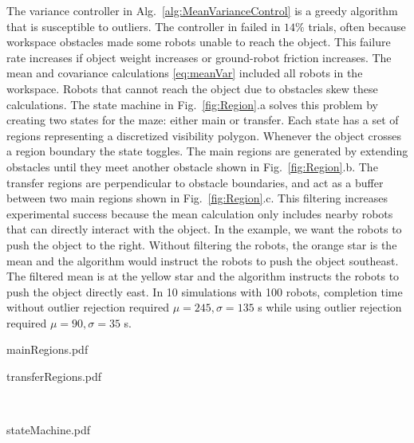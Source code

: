 The variance controller in Alg.~\ref{alg:MeanVarianceControl} is a greedy algorithm that is susceptible to outliers. The controller in \cite{Shahrokhi2015} failed in $14\%$ trials, often because workspace obstacles made some robots unable to reach the object. This failure rate increases if  object weight increases or ground-robot friction increases. The mean and covariance calculations \eqref{eq:meanVar} included all robots in the workspace. Robots that cannot reach the object due to obstacles skew these calculations. The state machine in Fig.\ \ref{fig:Region}.a solves this problem by creating two states for the maze: either main or transfer. Each state has a set of regions representing a discretized visibility polygon. Whenever the object crosses a region boundary the state toggles. The main regions are generated by extending obstacles until they meet another obstacle shown in Fig.~\ref{fig:Region}.b. The transfer regions are perpendicular to obstacle boundaries, and act as a buffer between two main regions shown in Fig.~\ref{fig:Region}.c.
This filtering increases experimental success because the mean calculation only includes nearby robots that can directly interact with the object. In the example, we want the robots to push the object to the right. Without filtering the robots, the orange star is the mean and the algorithm would instruct the robots to push the object southeast. The filtered mean is at the yellow star and the algorithm instructs the robots to push the object directly east. 
In 10 simulations with 100 robots, completion time without outlier rejection required $\mu=245, \sigma=135$ s while using outlier rejection required $\mu=90, \sigma=35$ s.


\begin{figure*}
\begin{center}
	\begin{overpic}[width=0.45\columnwidth]{mainRegions.pdf}\end{overpic}
	\begin{overpic}[width=0.45\columnwidth]{transferRegions.pdf}\end{overpic}\\
	\vspace{0.5em}
	\begin{overpic}[width=0.6\columnwidth]{stateMachine.pdf}\end{overpic}
\end{center}
\caption{\label{fig:Region}  Outlier rejection state machine and regions.
}
\end{figure*}

